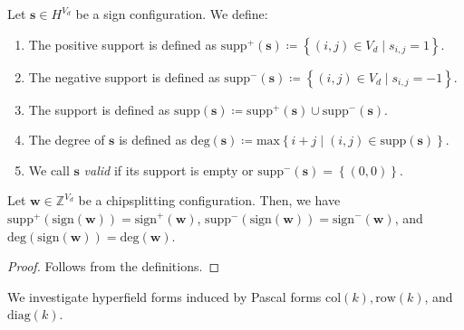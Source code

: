 \begin{definition}
    Let \( \mathbf{s} \in H^{V_d} \) be a sign configuration. We define:
    \begin{enumerate}
        \item The positive support is defined as \( \mathrm{supp}^+(\mathbf{s}) \coloneqq \left\{ (i,j) \in V_d \mid s_{i,j} = 1 \right\} \).
        \item The negative support is defined as \( \mathrm{supp}^-(\mathbf{s}) \coloneqq \left\{ (i,j) \in V_d \mid s_{i,j} = -1 \right\} \).
        \item The support is defined as \( \mathrm{supp}(\mathbf{s}) \coloneqq \mathrm{supp}^+(\mathbf{s}) \cup \mathrm{supp}^-(\mathbf{s}) \).
        \item The degree of \( \mathbf{s} \) is defined as \( \mathrm{deg}(\mathbf{s}) \coloneqq \mathrm{max}\left\{ i + j \mid (i,j) \in \mathrm{supp}(\mathbf{s}) \right\} \).
        \item We call \( \mathbf{s} \) \emph{valid} if its support is empty or \( \mathrm{supp}^-(\mathbf{s}) = \left\{ (0,0) \right\} \).
    \end{enumerate}
\end{definition}

\begin{lemma}
    Let \( \mathbf{w} \in \mathbb{Z}^{V_d} \) be a chipsplitting configuration. Then, we have \( \mathrm{supp}^+(\mathrm{sign}(\mathbf{w})) = \mathrm{sign}^+(\mathbf{w}) \), \( \mathrm{supp}^-(\mathrm{sign}(\mathbf{w})) = \mathrm{sign}^-(\mathbf{w}) \), and  \( \mathrm{deg}(\mathrm{sign}(\mathbf{w})) = \mathrm{deg}(\mathbf{w}) \).
\end{lemma}

\begin{proof}
    Follows from the definitions.
\end{proof}

We investigate hyperfield forms induced by Pascal forms \( \mathrm{col}(k), \mathrm{row}(k) \), and \( \mathrm{diag}(k) \).


